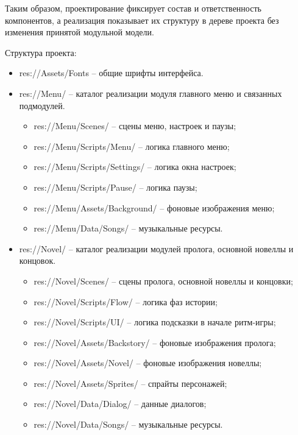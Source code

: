 \documentclass[utf8, russian]{eskdtext}
\numberwithin{equation}{section}
\begin{document}
Таким образом, проектирование фиксирует состав и ответственность компонентов, а реализация показывает их структуру в дереве проекта без изменения принятой модульной модели.

Структура проекта:

\begin{itemize}
    \item res://Assets/Fonts -- общие шрифты интерфейса.

    \item res://Menu/ -- каталог реализации модуля главного меню и связанных подмодулей.
    \begin{itemize}
        \item res://Menu/Scenes/ -- сцены меню, настроек и паузы;
        \item res://Menu/Scripts/Menu/ -- логика главного меню;
        \item res://Menu/Scripts/Settings/ -- логика окна настроек;
        \item res://Menu/Scripts/Pause/ -- логика паузы;
        \item res://Menu/Assets/Background/ -- фоновые изображения меню;
        \item res://Menu/Data/Songs/ -- музыкальные ресурсы.
    \end{itemize}

    \item res://Novel/ -- каталог реализации модулей пролога, основной новеллы и концовок.
    \begin{itemize}
        \item res://Novel/Scenes/ -- сцены пролога, основной новеллы и концовки;
        \item res://Novel/Scripts/Flow/ -- логика фаз истории;
        \item res://Novel/Scripts/UI/ -- логика подсказки в начале ритм-игры;
        \item res://Novel/Assets/Backstory/ -- фоновые изображения пролога;
        \item res://Novel/Assets/Novel/ -- фоновые изображения новеллы;
        \item res://Novel/Assets/Sprites/ -- спрайты персонажей;
        \item res://Novel/Data/Dialog/ -- данные диалогов;
        \item res://Novel/Data/Songs/ -- музыкальные ресурсы.
    \end{itemize}


\end{itemize}
\end{document}
